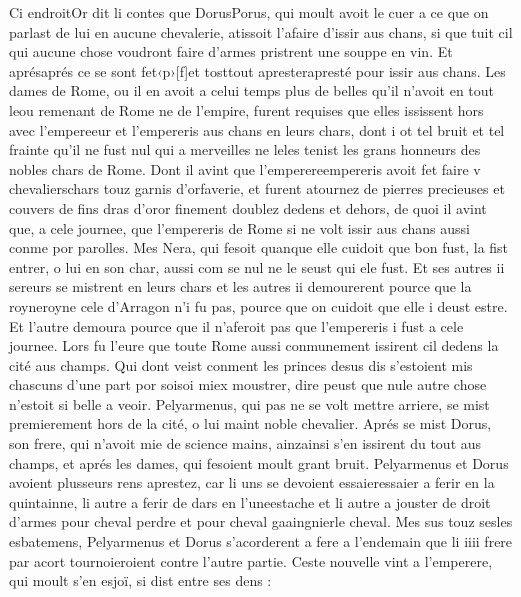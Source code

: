 \documentclass{article}
\begin{document}
\begin{pages}
            
\pstart Ci endroitOr dit li contes que 
   DorusPorus, qui moult avoit le cuer a ce que on parlast de lui en aucune chevalerie, 
   atissoit l’afaire d’issir aus chans, si que tuit cil qui aucune chose voudront faire d'armes pristrent une souppe en vin. 
   Et aprésaprés ce se sont 
   fet‹p›[f]et 
   tosttout
   apresterapresté pour issir aus chans. 
   Les dames de Rome, ou il en avoit a celui temps plus de belles 
   qu’il n’avoit en tout leou remenant 
   de Rome ne de l’empire, 
   furent requises que elles ississent hors avec 
   l’empereeur et l’empereris aus chans en leurs chars, 
   dont i ot tel bruit et tel frainte qu’il ne fust nul qui a merveilles ne 
   leles tenist les
   grans honneurs des nobles chars de Rome. Dont il avint que 
   l’emperereempereris avoit 
   fet faire v chevalierschars touz garnis d’orfaverie, 
   et furent atournez de pierres precieuses et couvers de fins dras 
   d’oror finement doublez dedens et dehors, 
   de quoi il avint que, a cele journee, que 
   l’empereris de Rome si ne volt issir aus 
   chans aussi conme por parolles. Mes Nera, qui fesoit quanque elle cuidoit que bon fust, 
   la fist entrer, o lui en son char, aussi com se nul ne 
   le seust qui ele fust. 
   Et ses autres ii sereurs se mistrent en leurs chars et les autres ii demourerent pource 
   que la royneroyne cele 
      d’Arragon n’i fu pas, 
   pource que on cuidoit que elle i deust estre. Et l’autre demoura pource que il n’aferoit pas que 
   l’empereris i fust a cele journee. \pend
\pstart Lors fu l’eure que toute 
   Rome aussi conmunement issirent cil dedens la cité aus champs. Qui dont 
   veist conment les princes desus dis s’estoient mis chascuns d’une part por 
   soisoi miex moustrer, dire peust que nule autre chose n’estoit si belle a veoir. 
   Pelyarmenus, qui pas ne se volt mettre arriere, se mist premierement hors de 
   la cité, o lui maint noble chevalier. Aprés se mist Dorus, son frere, 
   qui n’avoit mie de science mains, ainzainsi 
   s’en issirent du tout aus champs, et aprés les dames, 
               qui fesoient moult grant bruit. Pelyarmenus et Dorus 
   avoient plusseurs rens aprestez, car li uns se devoient essaieressaier a ferir 
   en la quintainne, li autre a ferir de dars en l’uneestache et li autre a jouster 
   de droit d’armes pour cheval perdre et pour cheval gaaingnierle cheval. 
   Mes sus touz sesles esbatemens, 
   Pelyarmenus et Dorus
   s’acorderent a fere a l’endemain que li iiii frere par acort tournoieroient contre l’autre partie.
   Ceste nouvelle vint a l’emperere, qui moult s’en esjoï, si dist entre ses dens :

\end{pages}
\end{document}
